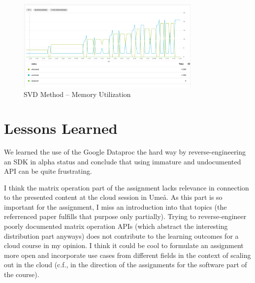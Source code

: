 \documentclass{prog_report}
\begin{document}
\begin{figure}[h]
    \centering
    \includegraphics[width=0.8\textwidth]{img/svd-memory}
    \caption{SVD Method – Memory Utilization}
    \label{fig:svd-mem}
\end{figure}

\section{Lessons Learned}
We learned the use of the Google Dataproc the hard way by reverse-engineering an SDK in alpha status and conclude that using immature and undocumented API can be quite frustrating.

I think the matrix operation part of the assignment lacks relevance in connection to the presented content at the cloud session in Umeå.
As this part is so important for the assignment, I miss an introduction into that topics (the referrenced paper fulfills that purpose only partially).
Trying to reverse-engineer poorly documented matrix operation APIs (which abstract the interesting distribution part anyways) does not contribute to the learning outcomes for a cloud course in my opinion.
I think it could be cool to formulate an assignment more open and incorporate use cases from different fields in the context of scaling out in the cloud (c.f., in the direction of the assignments for the software part of the course).



\end{document}
